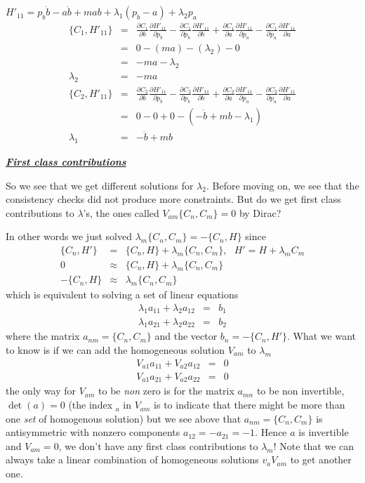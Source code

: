 \documentclass[aps,preprint,preprintnumbers,nofootinbib,showpacs,prd]{revtex4-1}
\newcommand{\nbea}{\begin{eqnarray*}}
\newcommand{\neea}{\end{eqnarray*}}
\begin{document}
$H'_{11} = p_b \dot b - a\dot b + m ab + \lambda_1 (p_b - a) + \lambda_2 p_a$
%
\nbea
\{C_1, H'_{11}\} & = & \frac{\partial C_1}{\partial b}\frac{\partial H'_{11}}{\partial p_b} - \frac{\partial C_1}{\partial p_b}\frac{\partial H'_{11}}{\partial b} + \frac{\partial C_1}{\partial a}\frac{\partial H'_{11}}{\partial p_a} - \frac{\partial C_1}{\partial p_a}\frac{\partial H'_{11}}{\partial a} \\
& = & 0 - (ma) - (\lambda_2) - 0 \\
& = & -ma - \lambda_2 \\
\lambda_2 & = & - ma  
\neea
%
%
\nbea
\{C_2, H'_{11}\} & = & \frac{\partial C_2}{\partial b}\frac{\partial H'_{11}}{\partial p_b} - \frac{\partial C_2}{\partial p_b}\frac{\partial H'_{11}}{\partial b} + \frac{\partial C_2}{\partial a}\frac{\partial H'_{11}}{\partial p_a} - \frac{\partial C_2}{\partial p_a}\frac{\partial H'_{11}}{\partial a} \\
& = & 0 - 0 + 0 -(-\dot b + mb - \lambda_1) \\
\lambda_1 & = & - \dot b + mb
\neea
%

\bigskip
\underline{\textbf{\textit{First class contributions}}}

So we see that we get different solutions for $\lambda_2$. Before moving on, we see that the consistency checks did not produce more constraints. But do we get first class contributions to $\lambda$'s, the ones called $V_{am}\{C_n, C_m\} = 0$ by Dirac?

In other words we just solved $\lambda_m\{C_n, C_m\} = -\{C_n, H\}$ since 
%
\nbea
\{C_n, H'\} & = & \{C_n, H\} + \lambda_m\{C_n, C_m\}, ~~~H' = H + \lambda_m C_m \\
0 & \approx & \{C_n, H\} + \lambda_m\{C_n, C_m\} \\
-\{C_n, H\} & \approx & \lambda_m\{C_n, C_m\}
\neea
%
which is equivalent to solving a set of linear equations
%
\nbea
\lambda_1 a_{11} + \lambda_2 a_{12} & = & b_1 \\
\lambda_1 a_{21} + \lambda_2 a_{22} & = & b_2 
\neea
%
where the matrix $a_{nm} = \{C_n, C_m\}$ and the vector $b_n = -\{C_n, H'\}$. What we want to know is if we can add the homogeneous solution $V_{am}$ to $\lambda_m$
%
\nbea
V_{a1} a_{11} + V_{a2} a_{12} & = & 0 \\
V_{a1} a_{21} + V_{a2} a_{22} & = & 0 
\neea
%
the only way for $V_{am}$ to be {\it non} zero is for the matrix $a_{mn}$ to be non invertible, $\det(a) = 0$ (the index $_a$ in $V_{am}$ is to indicate that there might be more than one {\it set} of homogenous solution) but we see above that $a_{nm} = \{C_n, C_m\}$ is antisymmetric with nonzero components $a_{12} = -a_{21} = -1$. Hence $a$ is invertible and $V_{am} = 0$, we don't have any first class contributions to $\lambda_m$! Note that we can always take a linear combination of homogeneous solutions $v_a V_{am}$ to get another one.
\end{document}
